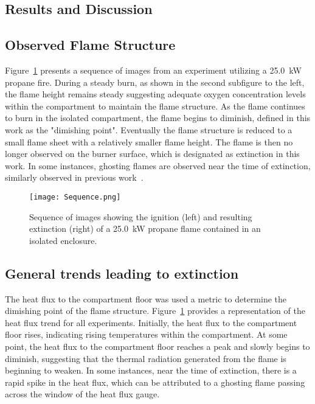 \documentclass[12pt,letterpaper]{article}
\begin{document}
\begin{flushleft}
\section{Results and Discussion} \addvspace{10pt}
\label{sec:results}
\subsection{Observed Flame Structure}
\label{ssec:Structure}
Figure~\ref{fig:Sequence} presents a sequence of images from an experiment utilizing a 25.0~kW propane fire. During a steady burn, as shown in the second subfigure to the left, the flame height remains steady suggesting adequate oxygen concentration levels within the compartment to maintain the flame structure. As the flame continues to burn in the isolated compartment, the flame begins to diminish, defined in this work as the "dimishing point". Eventually the flame structure is reduced to a small flame sheet with a relatively smaller flame height. The flame is then no longer observed on the burner surface, which is designated as extinction in this work. In some instances, ghosting flames are observed near the time of extinction, similarly observed in previous work~\cite{utiskul2005compartment}.
\begin{figure}[h!]
	\centering
\texttt{[image: Sequence.png]}
	\caption{Sequence of images showing the ignition (left) and resulting extinction (right) of a 25.0~kW propane flame contained in an isolated enclosure.}
	\label{fig:Sequence}
\end{figure}

\subsection{General trends leading to extinction}
\label{ssec:Trends}
The heat flux to the compartment floor was used a metric to determine the dimishing point of the flame structure. Figure~\ref{} provides a representation of the heat flux trend for all experiments. Initially, the heat flux to the compartment floor rises, indicating rising temperatures within the compartment. At some point, the heat flux to the compartment floor reaches a peak and slowly begins to diminish, suggesting that the thermal radiation generated from the flame is beginning to weaken. In some instances, near the time of extinction, there is a rapid spike in the heat flux, which can be attributed to a ghosting flame passing across the window of the heat flux gauge. 


\end{flushleft}
\end{document}
